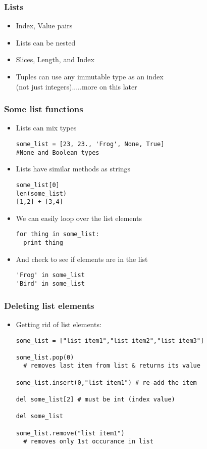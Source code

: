 \documentclass{beamer}
\begin{document}
\begin{frame}[fragile]
\frametitle{Lists}
\begin{itemize}
\item Index, Value pairs
\item Lists can be nested
\item Slices, Length, and Index
\item Tuples can use any immutable type as an index \\
  (not just integers).....more on this later
\end{itemize}
\end{frame}

\begin{frame}[fragile]
\frametitle{Some list functions}
\begin{itemize}
\item Lists can mix types
\begin{lstlisting}
some_list = [23, 23., 'Frog', None, True] 
#None and Boolean types
\end{lstlisting}
\item Lists have similar methods as strings
\begin{lstlisting}
some_list[0]
len(some_list)
[1,2] + [3,4]
\end{lstlisting}
\item We can easily loop over the list elements
\begin{lstlisting}
for thing in some_list: 
  print thing
\end{lstlisting}
\item And check to see if elements are in the list
\begin{lstlisting}
'Frog' in some_list
'Bird' in some_list
\end{lstlisting}
\end{itemize}
\end{frame}

\begin{frame}[fragile]
\frametitle{Deleting list elements}
\begin{itemize}
\item Getting rid of list elements:
\begin{lstlisting}
some_list = ["list item1","list item2","list item3"]

some_list.pop(0)
  # removes last item from list & returns its value

some_list.insert(0,"list item1") # re-add the item

del some_list[2] # must be int (index value)

del some_list

some_list.remove("list item1") 
  # removes only 1st occurance in list
\end{lstlisting}
\end{itemize}
\end{frame}
\end{document}
